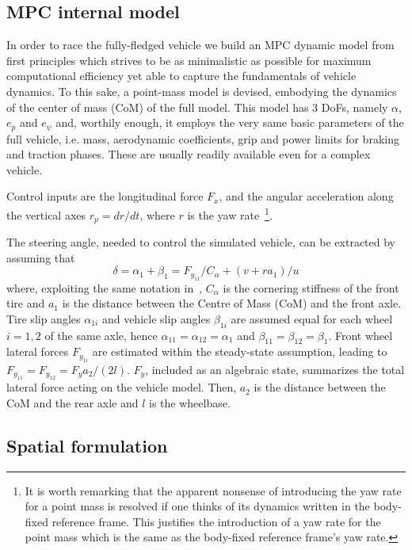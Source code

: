 \documentclass[conference]{IEEEtran} %
\begin{document}
\subsection{MPC internal model}

In order to race the fully-fledged vehicle we build an MPC dynamic model from first principles which strives to be as minimalistic as possible for maximum computational efficiency yet able to capture the fundamentals of vehicle dynamics. To this sake, a point-mass model is devised, embodying the dynamics of the center of mass (CoM) of the full model.
This model has 3 DoFs, namely $\alpha$, $e_p$ and $e_{\psi}$ and, worthily enough, it employs the very same basic parameters of the full vehicle, i.e. mass, aerodynamic coefficients, grip and power limits for braking and traction phases. These are usually readily available even for a complex vehicle.

Control inputs are the longitudinal force $F_{x}$, and the angular acceleration along the vertical axes $r_p = dr/dt$, where $r$ is the yaw rate~\footnote{It is worth remarking that the apparent nonsense of introducing the yaw rate for a point mass is resolved if one thinks of its dynamics written in the body-fixed reference frame. This justifies the introduction of a yaw rate for the point mass which is the same as the body-fixed reference frame's yaw rate.}.

The steering angle, needed to control the simulated vehicle, can be extracted by assuming that
\begin{equation}
\delta = \alpha_{1} + \beta_1 = F_{y_{11}}/C_\alpha + (v + ra_1)/u
\end{equation}
where, exploiting the same notation in~\cite{Guiggiani2018}, $C_\alpha$ is the cornering stiffness of the front tire and $a_1$ is the distance between the Centre of Mass (CoM) and the front axle.
Tire slip angles $\alpha_{1i}$ and vehicle slip angles $\beta_{1i}$ are assumed equal for each wheel $i=1, 2$ of the same axle, hence $\alpha_{11} = \alpha_{12} = \alpha_{1}$ and $\beta_{11} = \beta_{12} = \beta_{1}$.
%
Front wheel lateral forces $F_{y_{1i}}$ are estimated within the steady-state assumption, leading to $F_{y_{11}} = F_{y_{12}} = F_{y}a_2/(2l)$.
$F_{y}$, included as an algebraic state, summarizes the total lateral force acting on the vehicle model. Then, $a_2$ is the distance between the CoM and the rear axle and $l$ is the wheelbase.

\subsection{Spatial formulation}
\end{document}
